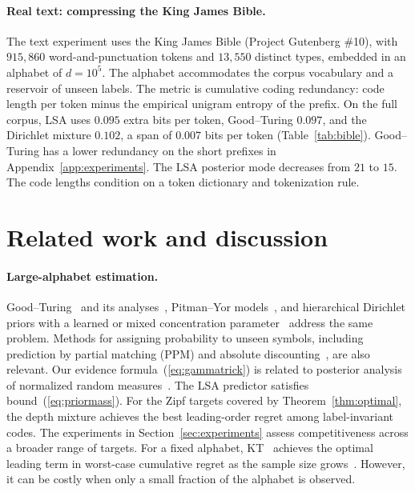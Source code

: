\documentclass[anon]{alt2027}
\renewcommand{\eqref}[1]{(\ref{#1})}
\begin{document}
\paragraph{Real text: compressing the King James Bible.}
The text experiment uses the King James Bible (Project Gutenberg \#10), with $915{,}860$ word-and-punctuation tokens and $13{,}550$ distinct types, embedded in an alphabet of $d=10^5$. The alphabet accommodates the corpus vocabulary and a reservoir of unseen labels. The metric is cumulative coding redundancy: code length per token minus the empirical unigram entropy of the prefix. On the full corpus, LSA uses $0.095$ extra bits per token, Good--Turing $0.097$, and the Dirichlet mixture $0.102$, a span of $0.007$ bits per token (Table~\ref{tab:bible}). Good--Turing has a lower redundancy on the short prefixes in Appendix~\ref{app:experiments}. The LSA posterior mode decreases from $21$ to $15$. The code lengths condition on a token dictionary and tokenization rule.

\section{Related work and discussion}
\label{sec:discussion}

\paragraph{Large-alphabet estimation.} Good--Turing~\citep{good1953population,gale1995good} and its analyses~\citep{orlitsky2003always,mcallester2000leave,acharya2013tight,orlitsky2015competitive,valiant2016instance,ohannessian2012rare,falahatgar2017power}, Pitman--Yor models~\citep{teh2006hierarchical}, and hierarchical Dirichlet priors with a learned or mixed concentration parameter~\citep{mackay1995hierarchical,friedman1998efficient,hutter2013sparse} address the same problem. Methods for assigning probability to unseen symbols, including prediction by partial matching (PPM) and absolute discounting~\citep{cleary1984data,witten1991zero}, are also relevant. Our evidence formula~\eqref{eq:gammatrick} is related to posterior analysis of normalized random measures~\citep{james2009posterior}. The LSA predictor satisfies bound~\eqref{eq:priormass}. For the Zipf targets covered by Theorem~\ref{thm:optimal}, the depth mixture achieves the best leading-order regret among label-invariant codes. The experiments in Section~\ref{sec:experiments} assess competitiveness across a broader range of targets. For a fixed alphabet, KT~\citep{krichevsky1981performance} achieves the optimal leading term in worst-case cumulative regret as the sample size grows~\citep{xie2000asymptotic}. However, it can be costly when only a small fraction of the alphabet is observed.
\end{document}
